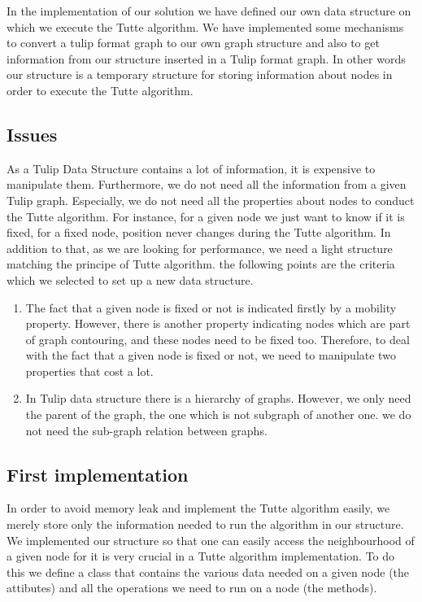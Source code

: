 In the implementation of our solution we have defined our own data
structure on which we execute the Tutte algorithm. We have
implemented some mechanisms to convert a tulip format graph to our own
graph structure and also to get information from our structure
inserted in a Tulip format graph. In other words our structure is a
temporary structure for storing information about nodes in order to
execute the Tutte algorithm.

\subsection{Issues}
As a Tulip Data Structure contains a lot of information, it is expensive to
manipulate them. Furthermore, we do not need all the information
from a given Tulip graph. Especially, we do not need all
the properties about nodes to conduct the Tutte algorithm. For
instance, for a given node we just want to know if it is fixed, for a
fixed node, position never changes during the Tutte algorithm. In
addition to that, as we are looking for performance, we need a light structure matching the principe of Tutte algorithm. the following points are the criteria which we selected to set up a new data structure.
\begin{enumerate}
\item The fact that a given node is fixed or not is indicated firstly
  by a mobility property. However, there is another property indicating
  nodes which are part of graph contouring, and these nodes need to be
  fixed too. Therefore, to deal with the fact that a given node is fixed or
  not, we need to manipulate two properties that cost a lot.

\item In Tulip data structure there is a hierarchy of graphs. However, we only need
  the parent of the graph, the one which is not subgraph of another
  one. we do not need the sub-graph relation between graphs.


\end{enumerate}  

\subsection{First implementation}
In order to avoid memory leak and implement the Tutte
algorithm easily, we merely store only the information
needed to run the algorithm in our structure. We implemented our structure so that one
can easily access the neighbourhood of a given node for it is very
crucial in a Tutte algorithm implementation. To do this we define a
class that contains the various data needed on a given node (the
attibutes) and all the operations we need to run on a node (the
methods).

